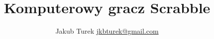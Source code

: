 \documentclass[10pt,a4paper]{beamer}
\author{\texorpdfstring{Jakub Turek \newline \href{mailto:jkbturek@gmail.com}{jkbturek@gmail.com}}{Jakub Turek}}
\title{Komputerowy gracz Scrabble}
\institute{Wydział Elektroniki i Technik Informacyjnych}
\begin{document}
\begin{frame}
	\titlepage
\end{frame}
\end{document}
